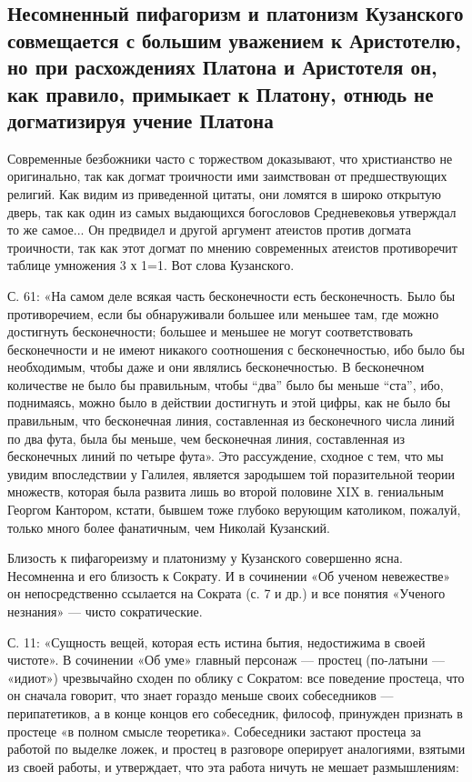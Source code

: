\subsection{Несомненный пифагоризм и  платонизм Кузанского совмещается
с  большим  уважением  к   Аристотелю,  но  при  расхождениях  Платона
и  Аристотеля  он,  как  правило,   примыкает  к  Платону,  отнюдь  не
догматизируя учение Платона}

Современные безбожники часто с торжеством доказывают, что христианство
не  оригинально,   так  как  догмат  троичности   ими  заимствован  от
предшествующих религий. Как видим из приведенной цитаты, они ломятся в
широко открытую  дверь, так  как один  из самых  выдающихся богословов
Средневековья утверждал то же самое...  Он предвидел и другой аргумент
атеистов  против догмата  троичности, так  как этот  догмат по  мнению
современных атеистов противоречит таблице умножения 3 х 1=1. Вот слова
Кузанского.

С. 61: «На  самом деле всякая часть  бесконечности есть бесконечность.
Было бы противоречием,  если бы обнаруживали большее  или меньшее там,
где  можно  достигнуть  бесконечности;  большее  и  меньшее  не  могут
соответствовать  бесконечности  и  не  имеют  никакого  соотношения  с
бесконечностью, ибо  было бы  необходимым, чтобы  даже и  они являлись
бесконечностью.  В  бесконечном  количестве  не  было  бы  правильным,
чтобы  ``два'' было  бы меньше  ``ста'', ибо,  поднимаясь, можно  было
в  действии  достигнуть и  этой  цифры,  как  не было  бы  правильным,
что  бесконечная  линия,  составленная  из  бесконечного  числа  линий
по  два фута,  была  бы меньше,  чем  бесконечная линия,  составленная
из  бесконечных линий  по  четыре фута».  Это  рассуждение, сходное  с
тем,  что мы  увидим впоследствии  у Галилея,  является зародышем  той
поразительной  теории множеств,  которая была  развита лишь  во второй
половине  XIX  в. гениальным  Георгом  Кантором,  кстати, бывшем  тоже
глубоко верующим  католиком, пожалуй,  только много  более фанатичным,
чем Николай Кузанский.

Близость  к пифагореизму  и платонизму  у Кузанского  совершенно ясна.
Несомненна  и  его  близость  к  Сократу. И  в  сочинении  «Об  ученом
невежестве» он непосредственно ссылается на Сократа (с. 7 и др.) и все
понятия «Ученого незнания» --- чисто сократические.

С. 11: «Сущность вещей, которая есть истина бытия, недостижима в своей
чистоте». В сочинении «Об уме» главный персонаж --- простец (по-латыни
--- «идиот»)  чрезвычайно сходен по  облику с Сократом:  все поведение
простеца,  что он  сначала  говорит, что  знает  гораздо меньше  своих
собеседников  ---  перипатетиков, а  в  конце  концов его  собеседник,
философ, принужден  признать в  простеце «в полном  смысле теоретика».
Собеседники застают простеца за работой  по выделке ложек, и простец в
разговоре оперирует аналогиями, взятыми из своей работы, и утверждает,
что эта работа ничуть не мешает размышлениям:

